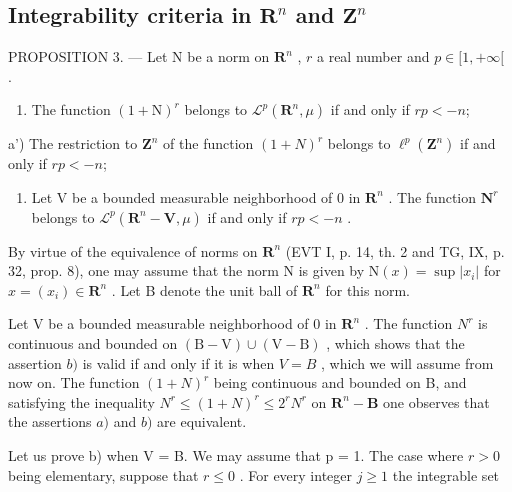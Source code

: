 \subsection{\texorpdfstring{Integrability criteria in \(\mathbf{R}^{n}\) and \(\mathbf{Z}^{n}\)}{Integrability criteria in \textbackslash mathbf\{R\}\^{}\{n\} and \textbackslash mathbf\{Z\}\^{}\{n\}}}

PROPOSITION 3. --- Let N be a norm on \(\mathbf{R}^{n}\) , \(r\) a real number and \(p \in [1, +\infty[\) .

\begin{enumerate}
\def\labelenumi{\alph{enumi})}
\tightlist
\item
  The function \((1 + \mathrm{N})^{r}\) belongs to \(\mathcal{L}^{p}(\mathbf{R}^{n}, \mu)\) if and only if \(rp < -n\);
\end{enumerate}

a') The restriction to \(\mathbf{Z}^{n}\) of the function \((1+N)^{r}\) belongs to \(\ell^{p}(\mathbf{Z}^{n})\) if and only if \(rp < -n\);

\begin{enumerate}
\def\labelenumi{\alph{enumi})}
\setcounter{enumi}{1}
\tightlist
\item
  Let V be a bounded measurable neighborhood of 0 in \(\mathbf{R}^{n}\) . The function \(\mathbf{N}^{r}\) belongs to \(\mathcal{L}^{p}(\mathbf{R}^{n}-\mathbf{V},\mu)\) if and only if \(rp<-n\) .
\end{enumerate}

By virtue of the equivalence of norms on \(\mathbf{R}^{n}\) (EVT I, p. 14, th. 2 and TG, IX, p. 32, prop. 8), one may assume that the norm N is given by \(\mathrm{N}(x)=\sup|x_{i}|\) for \(x=(x_{i})\in\mathbf{R}^{n}\) . Let B denote the unit ball of \(\mathbf{R}^{n}\) for this norm.

Let V be a bounded measurable neighborhood of 0 in \(\mathbf{R}^n\) . The function \(N^r\) is continuous and bounded on \((\mathrm{B - V})\cup (\mathrm{V - B})\) , which shows that the assertion \(b)\) is valid if and only if it is when \(V = B\) , which we will assume from now on. The function \((1 + N)^r\) being continuous and bounded on B, and satisfying the inequality \(N^r\leqslant (1 + N)^r\leqslant 2^r N^r\) on \(\mathbf{R}^n -\mathbf{B}\) one observes that the assertions \(a)\) and \(b)\) are equivalent.

Let us prove b) when V = B. We may assume that p = 1. The case where \(r > 0\) being elementary, suppose that \(r \leqslant 0\) . For every integer \(j \geqslant 1\) the integrable set

